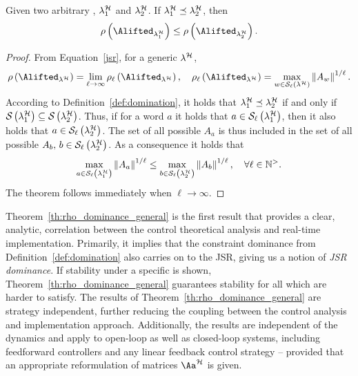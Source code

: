\begin{theorem}%
    \label{th:rho_dominance_general}%
    Given two arbitrary \ewhc{}, $\lambda_1^{\mathcal{H}}$ and $\lambda_2^{\mathcal{H}}$.
    If $\lambda_1^{\mathcal{H}} \preceq \lambda_2^{\mathcal{H}}$, then
    \begin{equation*}
        \rho\funof{\Alifted_{\lambda_1^\strat}} \leq \rho\funof{\Alifted_{\lambda_2^\strat}}.
    \end{equation*}

    \begin{proof}
        From Equation~\eqref{jsr}, for a generic \ewhc{} $\lambda^{\mathcal{H}}$,
        \begin{equation*}
            \rho\left(\Alifted_{\lambda^\strat}\right) = \lim_{\ell\rightarrow \infty}\rho_\ell\left(\Alifted_{\lambda^\strat}\right), \quad \rho_\ell\left(\Alifted_{\lambda^\strat}\right) = \max_{w \in \sset{\ell}{\lambda^\strat}}\norm{A_{w}}^{1/\ell}.
        \end{equation*}
        According to Definition~\ref{def:domination}, it holds that $\lambda^{\mathcal{H}}_1 \preceq \lambda^{\mathcal{H}}_2$ if and only if $\mathcal{S}_{}\left( \lambda^{\mathcal{H}}_1 \right) \subseteq \mathcal{S}_{}\left( \lambda^{\mathcal{H}}_2 \right)$.
        Thus, if for a word $a$ it holds that $a \in \mathcal{S}_{\ell}\left( \lambda^{\mathcal{H}}_1 \right)$, then it also holds that $a \in \mathcal{S}_{\ell}\left( \lambda^{\mathcal{H}}_2 \right)$.
        The set of all possible $A_{a}$ is thus included in the set of all possible $A_{b},\, b \in \mathcal{S}_{\ell}\left( \lambda^{\mathcal{H}}_2 \right)$.
        As a consequence it holds that
        \begin{equation*}
            \max_{a \in \mathcal{S}_{\ell}\left( \lambda^{\mathcal{H}}_1 \right)}\left\lVert A_{a}\right\rVert^{1/\ell} \leq
            \max_{b \in \mathcal{S}_{\ell}\left( \lambda^{\mathcal{H}}_2 \right)}\left\lVert A_{b}\right\rVert^{1/\ell}, \quad
            \forall \ell\in\mathbb{N}^{>}.
        \end{equation*}
        The theorem follows immediately when $\ell\rightarrow \infty$.
    \end{proof}
\end{theorem}

Theorem~\ref{th:rho_dominance_general} is the first result that provides a clear, analytic, correlation between the control theoretical analysis and real-time implementation.
Primarily, it implies that the constraint dominance from Definition~\ref{def:domination} also carries on to the JSR, giving us a notion of \emph{JSR dominance}.
If stability under a specific \ewhc{} is shown, Theorem~\ref{th:rho_dominance_general} guarantees stability for all \ewhc{} which are harder to satisfy.
The results of Theorem~\ref{th:rho_dominance_general} are strategy independent, further reducing the coupling between the control analysis and implementation approach.
Additionally, the results are independent of the dynamics and apply to open-loop as well as closed-loop systems, including feedforward controllers and any linear feedback control strategy -- provided that an appropriate reformulation of matrices $\Aa^\strat$ is given.

